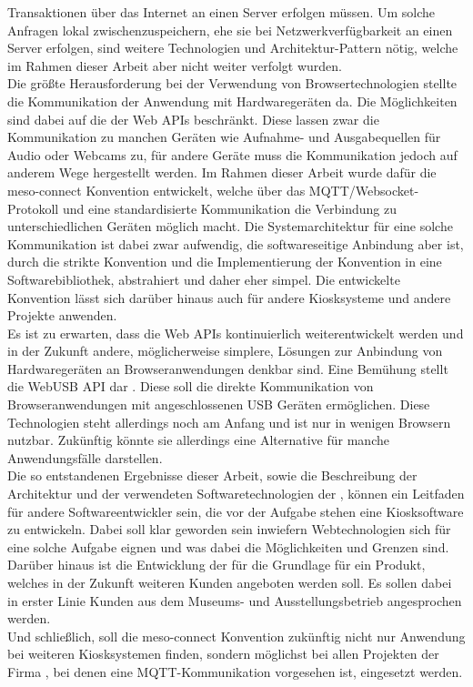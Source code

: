 Transaktionen über das Internet an einen Server erfolgen müssen. Um solche Anfragen lokal zwischenzuspeichern,
ehe sie bei Netzwerkverfügbarkeit an einen Server erfolgen, sind weitere Technologien und 
Architektur-Pattern nötig, welche im Rahmen dieser Arbeit aber nicht weiter verfolgt wurden.\\
Die größte Herausforderung bei der Verwendung von Browsertechnologien stellte die Kommunikation 
der Anwendung mit Hardwaregeräten da. 
Die Möglichkeiten sind dabei auf die der Web APIs beschränkt. Diese lassen zwar die Kommunikation zu manchen
Geräten wie Aufnahme- und Ausgabequellen für Audio oder Webcams zu, für andere Geräte muss die Kommunikation
jedoch auf anderem Wege hergestellt werden. Im Rahmen dieser Arbeit wurde dafür die meso-connect Konvention 
entwickelt, welche über das MQTT/Websocket-Protokoll und eine standardisierte Kommunikation die Verbindung
zu unterschiedlichen Geräten möglich macht. Die Systemarchitektur für eine solche Kommunikation ist dabei zwar
aufwendig, die softwareseitige Anbindung aber ist, durch die strikte Konvention und die Implementierung der Konvention
in eine Softwarebibliothek, abstrahiert und daher eher simpel. Die entwickelte Konvention lässt sich darüber 
hinaus auch für andere Kiosksysteme und andere Projekte anwenden.\\
Es ist zu erwarten, dass die Web APIs kontinuierlich weiterentwickelt werden und in der Zukunft andere,
möglicherweise simplere, Lösungen zur Anbindung von Hardwaregeräten an Browseranwendungen denkbar sind. Eine Bemühung
stellt die WebUSB API dar \cite{web-usb}. Diese soll die direkte Kommunikation von Browseranwendungen mit angeschlossenen
USB Geräten ermöglichen. Diese Technologien steht allerdings noch am Anfang und ist nur in wenigen Browsern 
nutzbar. Zukünftig könnte sie allerdings eine Alternative für manche Anwendungsfälle darstellen.\\

Die so entstandenen Ergebnisse dieser Arbeit, sowie die Beschreibung der Architektur und der verwendeten
Softwaretechnologien der \shst{}, können ein Leitfaden für andere Softwareentwickler sein, die 
vor der Aufgabe stehen eine Kiosksoftware zu entwickeln. Dabei soll klar geworden sein inwiefern 
Webtechnologien sich für eine solche Aufgabe eignen und was dabei die Möglichkeiten und Grenzen sind.\\
Darüber hinaus ist die Entwicklung der \shst{} für \meso{} die Grundlage für ein Produkt, 
welches in der Zukunft weiteren Kunden angeboten werden soll. Es sollen dabei in erster Linie Kunden 
aus dem Museums- und Ausstellungsbetrieb angesprochen werden.\\
Und schließlich, soll die meso-connect Konvention zukünftig nicht nur Anwendung bei weiteren Kiosksystemen finden, sondern 
möglichst bei allen Projekten der Firma \meso{}, bei denen eine MQTT-Kommunikation vorgesehen ist, eingesetzt
werden.
